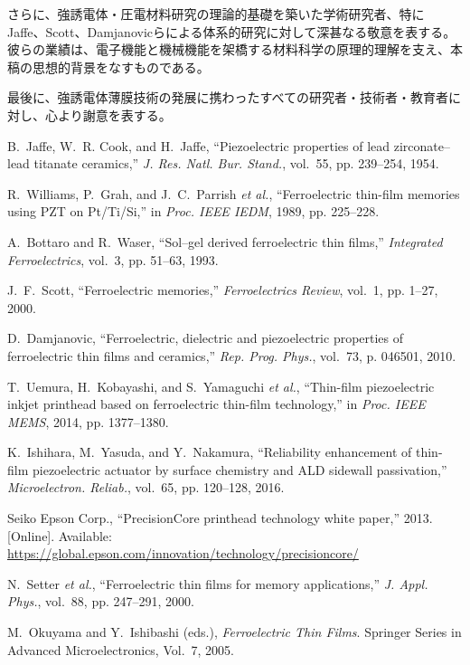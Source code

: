 \documentclass[conference]{IEEEtran}
\begin{document}
さらに、強誘電体・圧電材料研究の理論的基礎を築いた学術研究者、特にJaffe、Scott、Damjanovicらによる体系的研究に対して深甚なる敬意を表する。彼らの業績は、電子機能と機械機能を架橋する材料科学の原理的理解を支え、本稿の思想的背景をなすものである。

最後に、強誘電体薄膜技術の発展に携わったすべての研究者・技術者・教育者に対し、心より謝意を表する。

\begin{thebibliography}{10}

B.~Jaffe, W.~R. Cook, and H.~Jaffe, ``Piezoelectric properties of lead zirconate--lead titanate ceramics,'' \emph{J. Res. Natl. Bur. Stand.}, vol.~55, pp. 239--254, 1954.

R.~Williams, P.~Grah, and J.~C.~Parrish \emph{et al.}, ``Ferroelectric thin-film memories using PZT on Pt/Ti/Si,'' in \emph{Proc. IEEE IEDM}, 1989, pp. 225--228.

A.~Bottaro and R.~Waser, ``Sol--gel derived ferroelectric thin films,'' \emph{Integrated Ferroelectrics}, vol.~3, pp. 51--63, 1993.

J.~F.~Scott, ``Ferroelectric memories,'' \emph{Ferroelectrics Review}, vol.~1, pp. 1--27, 2000.

D.~Damjanovic, ``Ferroelectric, dielectric and piezoelectric properties of ferroelectric thin films and ceramics,'' \emph{Rep. Prog. Phys.}, vol.~73, p. 046501, 2010.

T.~Uemura, H.~Kobayashi, and S.~Yamaguchi \emph{et al.}, ``Thin-film piezoelectric inkjet printhead based on ferroelectric thin-film technology,'' in \emph{Proc. IEEE MEMS}, 2014, pp. 1377--1380.

K.~Ishihara, M.~Yasuda, and Y.~Nakamura, ``Reliability enhancement of thin-film piezoelectric actuator by surface chemistry and ALD sidewall passivation,'' \emph{Microelectron. Reliab.}, vol.~65, pp. 120--128, 2016.

Seiko Epson Corp., ``PrecisionCore printhead technology white paper,'' 2013. [Online]. Available: \url{https://global.epson.com/innovation/technology/precisioncore/}

N.~Setter \emph{et al.}, ``Ferroelectric thin films for memory applications,'' \emph{J. Appl. Phys.}, vol.~88, pp. 247--291, 2000.

M.~Okuyama and Y.~Ishibashi (eds.), \emph{Ferroelectric Thin Films}. Springer Series in Advanced Microelectronics, Vol.~7, 2005.

\end{thebibliography}
\end{document}
